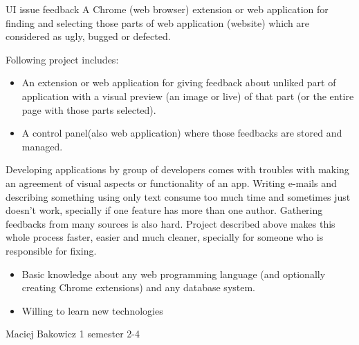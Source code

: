 \begin{project}
{UI issue feedback}
{A Chrome (web browser) extension or web application for finding and selecting those parts of web application (website) which are considered as ugly, bugged or defected.}
{
Following project includes: 
\begin{itemize}
	\item An extension or web application for giving feedback about unliked part of application with a visual preview (an image or live) of that part (or the entire page with those parts selected). 
	\item A control panel(also web application) where those feedbacks are stored and managed. 
\end{itemize}
\bigbreak
Developing applications by group of developers comes with troubles with making an agreement of visual aspects or functionality of an app. Writing e-mails and describing something using only text consume too much time and sometimes just doesn't work, specially if one feature has more than one author. Gathering feedbacks from many sources is also hard. 
\bigbreak
Project described above makes this whole process faster, easier and much cleaner, specially for someone who is responsible for fixing. 
}
{
\begin{itemize}
	\item Basic knowledge about any web programming language (and optionally creating Chrome extensions) and any database system.
	\item Willing to learn new technologies
\end{itemize}
}
{Maciej Bakowicz}
{1 semester}
{2-4}
\end{project}

